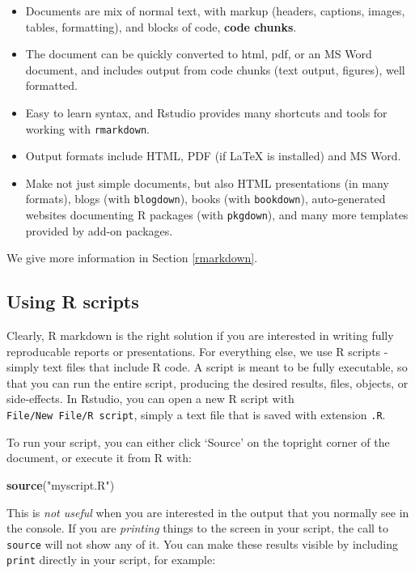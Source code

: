 \documentclass[]{book}
\newenvironment{Shaded}{\begin{snugshade}}{\end{snugshade}}
\newcommand{\KeywordTok}[1]{\textcolor[rgb]{0.13,0.29,0.53}{\textbf{#1}}}
\newcommand{\NormalTok}[1]{#1}
\newcommand{\StringTok}[1]{\textcolor[rgb]{0.31,0.60,0.02}{#1}}
\providecommand{\tightlist}{%
  \setlength{\itemsep}{0pt}\setlength{\parskip}{0pt}}
\begin{document}
\begin{itemize}
\tightlist
\item
  Documents are mix of normal text, with markup (headers, captions, images, tables, formatting), and blocks of code, \textbf{code chunks}.
\item
  The document can be quickly converted to html, pdf, or an MS Word document, and includes output from code chunks (text output, figures), well formatted.
\item
  Easy to learn syntax, and Rstudio provides many shortcuts and tools for working with \texttt{rmarkdown}.
\item
  Output formats include HTML, PDF (if LaTeX is installed) and MS Word.
\item
  Make not just simple documents, but also HTML presentations (in many formats), blogs (with \texttt{blogdown}), books (with \texttt{bookdown}), auto-generated websites documenting R packages (with \texttt{pkgdown}), and many more templates provided by add-on packages.
\end{itemize}

We give more information in Section \ref{rmarkdown}.

\hypertarget{scripts}{%
\subsection{Using R scripts}\label{scripts}}

Clearly, R markdown is the right solution if you are interested in writing fully reproducable reports or presentations. For everything else, we use R scripts - simply text files that include R code. A script is meant to be fully executable, so that you can run the entire script, producing the desired results, files, objects, or side-effects. In Rstudio, you can open a new R script with \texttt{File/New\ File/R\ script}, simply a text file that is saved with extension \texttt{.R}.

To run your script, you can either click `Source' on the topright corner of the document, or execute it from R with:

\begin{Shaded}
\begin{Highlighting}[]
\KeywordTok{source}\NormalTok{(}\StringTok{"myscript.R"}\NormalTok{)}
\end{Highlighting}
\end{Shaded}

This is \emph{not useful} when you are interested in the output that you normally see in the console. If you are \emph{printing} things to the screen in your script, the call to \texttt{source} will not show any of it. You can make these results visible by including \texttt{print} directly in your script, for example:
\end{document}
